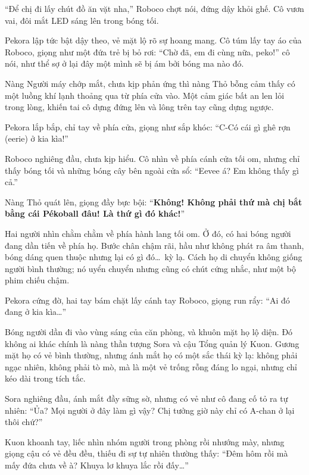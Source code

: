 \documentclass[../main.tex]{subfiles}
\begin{document}
``Để chị đi lấy chút đồ ăn vặt nha,'' Roboco chợt nói, đứng dậy khỏi ghế. Cô vươn vai, đôi mắt LED sáng lên trong bóng tối.


Pekora lập tức bật dậy theo, vẻ mặt lộ rõ sự hoang mang. Cô túm lấy tay áo của Roboco, giọng như một đứa trẻ bị bỏ rơi: ``Chờ đã, em đi cùng nữa, peko!'' cô nói, như thể sợ ở lại đây một mình sẽ bị ám bởi bóng ma nào đó.

Nàng Người máy chớp mắt, chưa kịp phản ứng thì nàng Thỏ bỗng cảm thấy có một luồng khí lạnh thoảng qua từ phía cửa vào. Một cảm giác bất an len lỏi trong lòng, khiến tai cô dựng đứng lên và lông trên tay cũng dựng ngược.


Pekora lắp bắp, chỉ tay về phía cửa, giọng như sắp khóc: ``C-Có cái gì ghê rợn (eerie) ở kia kìa!''

Roboco nghiêng đầu, chưa kịp hiểu. Cô nhìn về phía cánh cửa tối om, nhưng chỉ thấy bóng tối và những bóng cây bên ngoài cửa sổ: ``Eevee á? Em không thấy gì cả.''

Nàng Thỏ quát lên, giọng đầy bực bội: ``\textbf{Không! Không phải thứ mà chị bắt bằng cái Pékoball đâu! Là thứ gì đó khác!}''

Hai người nhìn chằm chằm về phía hành lang tối om. Ở đó, có hai bóng người đang dần tiến về phía họ. Bước chân chậm rãi, hầu như không phát ra âm thanh, bóng dáng quen thuộc nhưng lại có gì đó\dots\ kỳ lạ. Cách họ di chuyển không giống người bình thường; nó uyển chuyển nhưng cũng có chút cứng nhắc, như một bộ phim chiếu chậm.

Pekora cứng đờ, hai tay bám chặt lấy cánh tay Roboco, giọng run rẩy: ``Ai đó đang ở kia kìa\dots''

Bóng người dần đi vào vùng sáng của căn phòng, và khuôn mặt họ lộ diện. Đó không ai khác chính là nàng thần tượng Sora và cậu Tổng quản lý Kuon. Gương mặt họ có vẻ bình thường, nhưng ánh mắt họ có một sắc thái kỳ lạ: không phải ngạc nhiên, không phải tò mò, mà là một vẻ trống rỗng đáng lo ngại, nhưng chỉ kéo dài trong tích tắc.


Sora nghiêng đầu, ánh mắt đầy sững sờ, nhưng có vẻ như cô đang cố tỏ ra tự nhiên: ``Ủa? Mọi người ở đây làm gì vậy? Chị tưởng giờ này chỉ có A-chan ở lại thôi chứ?''

Kuon khoanh tay, liếc nhìn nhóm người trong phòng rồi nhướng mày, nhưng giọng cậu có vẻ đều đều, thiếu đi sự tự nhiên thường thấy: ``Đêm hôm rồi mà mấy đứa chưa về à? Khuya lơ khuya lắc rồi đấy\dots''
\end{document}
